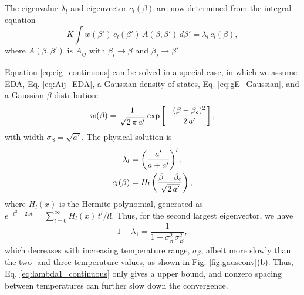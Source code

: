\documentclass{gMOS2e}
\begin{document}
The eigenvalue $\lambda_l$
and eigenvector $c_l(\beta)$
are now determined from the integral equation
%
\begin{equation}
K \int w(\beta') \, c_l(\beta') \, A(\beta, \beta') \, d\beta'
= \lambda_l \, c_l(\beta),
\label{eq:eig_continuous}
\end{equation}
%
where
$A(\beta, \beta')$
is $A_{ij}$
with 
{$\beta_i \rightarrow \beta$ and $\beta_j \rightarrow \beta'$.}



Equation \eqref{eq:eig_continuous}
can be solved in a special case, in which
we assume EDA, Eq. \eqref{eq:Aij_EDA},
a Gaussian density of states,
Eq. \eqref{eq:gE_Gaussian},
and
a Gaussian $\beta$ distribution:
%
\begin{align}
w(\beta)
=
\frac{1}{\sqrt{2 \, \pi \, a'}}
\exp\left[
  -\frac{ (\beta - \beta_c)^2 }{ 2 \, a' }
\right],
\notag
\end{align}
%
with width $\sigma_\beta = \sqrt{a'}$.
%
%
%
The physical solution is
%
\begin{align}
\lambda_l
&=
\left(
  \frac { a' } { a + a' }
\right)^l,
\notag
\\
c_l(\beta)
&=
H_l\left(
  \frac{ \beta - \beta_c }
  { \sqrt{ 2 \, a' } }
\right),
\notag
\end{align}
%
where
$H_l(x)$
is the Hermite polynomial\cite{
arfken, abramowitz, wang_specfunc},
generated as
$e^{-t^2 + 2x t} = \sum_{l = 0}^\infty H_l(x) \, t^l/l!$.
%
Thus, for the second largest eigenvector,
we have
%
\begin{equation}
1 - \lambda_1
=
\frac{1}
{ 1 + \sigma_\beta^2 \, \sigma_E^2},
\label{eq:lambda1_continuous}
\end{equation}
%
which decreases
with increasing temperature range,
$\sigma_\beta$,
albeit more slowly than
the two- and three-temperature values,
as shown in Fig. \ref{fig:gausconv}(b).
%
Thus,
Eq. \eqref{eq:lambda1_continuous}
only gives a upper bound,
and nonzero spacing between temperatures
can further slow down the convergence.




\end{document}
